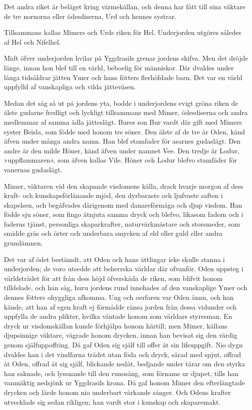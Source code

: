 Det andra riket är beläget kring värmekällan, och denna har fått till
sina väktare de tre nornorna eller ödesdiserna, Urd och hennes systrar.

Tillsammans kallas Mimers och Urds riken för Hel. Underjorden utgöres
således af Hel och Nifelhel.

Midt öfver underjorden hvilar på Yggdrasils grenar jordens skifva. Men
det dröjde länge, innan hon blef till en värld, beboelig för människor.
Där dvaldes under långa tidsåldrar jätten Ymer och hans fötters flerhöfdade barn. Det var en värld uppfylld af vanskapliga och vilda jätteväsen.

Medan det såg så ut på jordens yta, bodde i underjordens evigt gröna
riken de älste gudarne fredligt och lyckligt tillsammans med Mimer,
ödesdiserna och andra medlemmar af samma ädla jätteslägt. Bures son Bur
vardt där gift med Mimers syster Beisla, som födde med honom tre söner.
Den älste af de tre är Oden, känd äfven under många andra namn. Han blef
stamfader för asarnes gudaslägt. Den andre är den milde Höner, känd
äfven under namnet Vee. Den tredje är Lodur, »uppflammaren», som äfven
kallas Vile. Höner och Lodur blefvo stamfäder för vanernas gudaslägt.

Mimer, väktaren vid den skapande visdomens källa, drack hvarje morgon af
dess kraft- och kunskapsförlänande mjöd, den dyrbaraste och ljufvaste
saften i skapelsen, och begåfvades därigenom med danareförmåga och djup
visdom. Han födde sju söner, som fingo åtnjuta samma dryck och blefvo,
likasom fadern och i faderns tjänst, personliga skaparkrafter,
naturvärkmästare och storsmeder, som smidde gräs och örter och underbara
smycken af eld eller guld eller andra grundämnen.

Det var af ödet bestämdt, att Oden och hans ättlingar icke skulle stanna
i underjorden; de voro utsedde att beherrska världar där ofvanför. Oden
uppsteg i världsträdet för att från dess höjd öfverskåda de riken, som
blifvit honom tilldelade, och han såg, huru jordens rund innehades af
den vanskaplige Ymer och dennes fötters ohyggliga afkomma. Ung och
oerfaren var Oden ännu, och han kände, att han af egen kraft ej förmådde
ränsa jorden från dessa vidunder och uppfylla de andra plikter, hvilka
väntade honom som världars styresman. En dryck ur visdomskällan kunde
förhjälpa honom härtill; men Mimer, källans djupsinnige väktare, vägrade
honom drycken, innan han bevisat sig den värdig genom själfuppoffring.
Då gaf Oden sig själf till offer åt sin lifsuppgift. Nio dygn dvaldes
han i det vindfarna trädet utan föda och dryck, sårad med spjut, offrad
åt Oden, offrad åt sig själf, blickande nedåt, bedjande under tårar om den styrka han
saknade, och lyssnande till den runosång, som förnams ur djupet, tills
han vanmäktig nedsjönk ur Yggdrasils krona. Då gaf honom Mimer den
efterlängtade drycken och lärde honom nio underbart värkande sånger. Och
Odens krafter utvecklade sig sedan rikligen; han vardt stor i kunskap
och skaparemakt.

